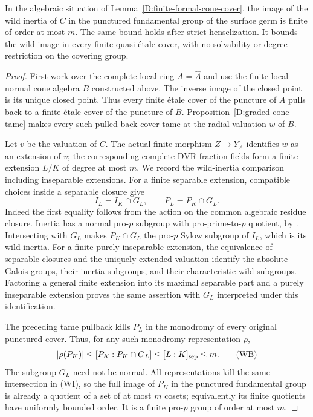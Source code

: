 \begin{proposition}
\label{D:finite-cone-wild-bound}
In the algebraic situation of Lemma~\ref{D:finite-formal-cone-cover},
the image of the wild inertia of $C$ in the punctured
fundamental group of the surface germ is finite of order at
most $m$.  The same bound holds after strict henselization.
It bounds the wild image in every finite quasi-\'etale cover,
with no solvability or degree restriction on the covering group.
\end{proposition}

\begin{proof}
First work over the complete local ring $A=\widehat A$ and
use the finite local normal cone algebra $B$ constructed above.
The inverse image of the closed point is its unique closed
point.  Thus every finite \'etale cover of the puncture of $A$
pulls back to a finite \'etale cover of the puncture of $B$.
Proposition~\ref{D:graded-cone-tame} makes every such pulled-back
cover tame at the radial valuation $w$ of $B$.

Let $v$ be the valuation of $C$.  The actual finite morphism
$Z\to Y_A$ identifies $w$ as an extension of $v$; the corresponding
complete DVR fraction fields form a finite extension $L/K$ of
degree at most $m$.  We record the wild-inertia comparison
including inseparable extensions.  For a finite separable
extension, compatible choices inside a separable closure give
\[
 I_L=I_K\cap G_L,\qquad P_L=P_K\cap G_L. \tag{WI}
\]
Indeed the first equality follows from the action on the
common algebraic residue closure.  Inertia has a normal
pro-$p$ subgroup with pro-prime-to-$p$ quotient, by
\cite[Lemma 58.13.5, tag 0BUA]{StacksBFiniteCone}.
Intersecting with $G_L$ makes $P_K\cap G_L$ the pro-$p$
Sylow subgroup of $I_L$, which is its wild inertia.
For a finite purely inseparable extension, the equivalence
of separable closures and the uniquely extended valuation
identify the absolute Galois groups, their inertia subgroups,
and their characteristic wild subgroups.  Factoring a general
finite extension into its maximal separable part and a purely
inseparable extension proves the same assertion with
$G_L$ interpreted under this identification.

The preceding tame pullback kills $P_L$ in the monodromy of
every original punctured cover.  Thus, for any such monodromy
representation $\rho$,
\[
 |\rho(P_K)|
 \leq [P_K:P_K\cap G_L]
 \leq [L:K]_{\rm sep}
 \leq m. \tag{WB}
\]
The subgroup $G_L$ need not be normal.  All representations
kill the same intersection in (WI), so the full image of
$P_K$ in the punctured fundamental group is already a
quotient of a set of at most $m$ cosets; equivalently its
finite quotients have uniformly bounded order.  It is a
finite pro-$p$ group of order at most $m$.


\end{proof}
